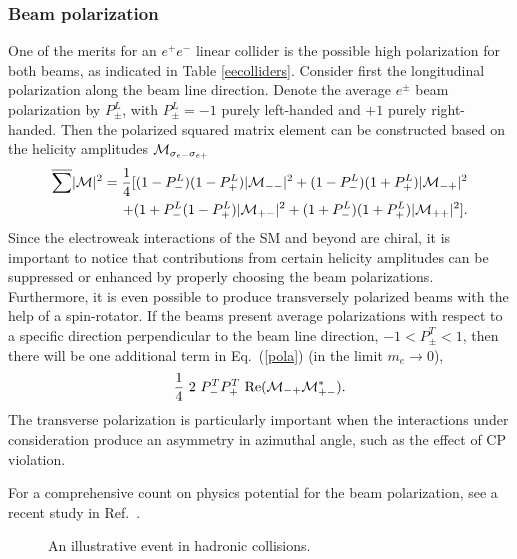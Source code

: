 \documentclass[12pt,prd,aps,floats,preprintnumbers,preprint,superscriptaddress,floatfix,nofootinbib]{revtex4}
\def\cM{{\cal M}}
\def\epem{e^+e^-}
\def\bea{\begin{eqnarray}}
\def\eea{\end{eqnarray}}
\begin{document}
\subsubsection{Beam polarization}
One of the merits for an $\epem$ linear collider is the possible high
polarization for both beams, as indicated in Table \ref{eecolliders}.
Consider first  the  longitudinal polarization along the beam line
direction.  Denote the average $e^\pm$ beam polarization by $P^L_\pm$, with 
$P^L_\pm=-1$ purely left-handed and  $+1$ purely right-handed. Then the
polarized squared matrix element can be constructed \cite{polar}
based on the helicity amplitudes $\cM_{\sigma_{e-} \sigma_{e+} }$
\bea
\nonumber
\overline{\sum} |\cM|^2 = {1\over 4}[
(1-P^L_-)(1-P^L_+) |\cM_{- -} |^2 +
(1-P^L_-)(1+P^L_+) |\cM_{- +}|^2 \\
+ (1+P^L_-(1-P^L_+) |\cM_{+ -}|^2 +
(1+P^L_-)(1+P^L_+) |\cM_{+ +}|^2 ].
\label{pola}
\eea
Since the electroweak interactions of the SM and beyond are chiral,
it is important to notice that contributions from certain helicity
amplitudes can be suppressed or enhanced by properly choosing
the beam polarizations. Furthermore, it is even possible to produce
transversely polarized beams with the help of a spin-rotator. If the 
beams present  average polarizations with respect to a specific 
direction perpendicular to the beam line direction, $-1 < P_\pm^T < 1$,
then there will be one additional term in Eq.~(\ref{pola})
(in the limit  $m_e\to 0$),
\bea
\nonumber
{1\over 4}\ 2\ P^T_- P^T_+\ {\rm Re}( \cM_{-+}\cM_{+-}^*).
\eea
The transverse polarization is particularly important when the
interactions under consideration produce an asymmetry in
azimuthal angle, such as the effect of CP violation.

For a comprehensive count on physics potential for the
beam polarization, see a recent study in Ref.~\cite{epolar}.

\begin{center}
\begin{figure}[tb]
\caption{An illustrative event in hadronic collisions.
\label{fig:event}}
\end{figure}
\end{center}
\end{document}
